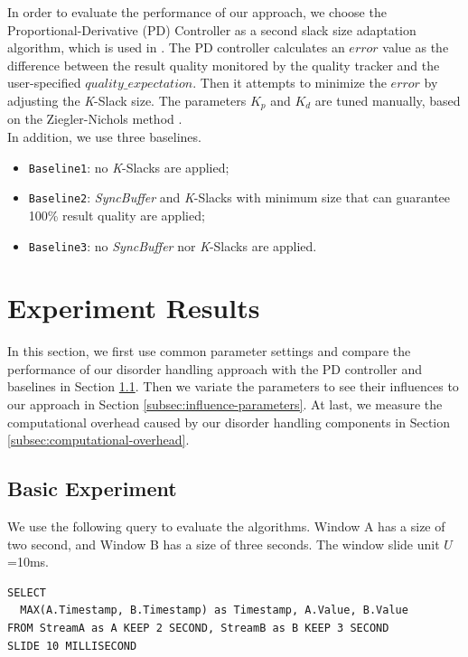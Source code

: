 \documentclass[a4paper, 11pt, twoside]{report}
\begin{document}
In order to evaluate the performance of our approach, we choose the Proportional-Derivative (PD) Controller \cite{astrom1995pid} as a second slack size adaptation algorithm, which is used in \cite{Lisa}. The PD controller calculates an $error$ value as the difference between the result quality monitored by the quality tracker and the user-specified $quality\_expectation$. Then it attempts to minimize the $error$ by adjusting the \textit{K}-Slack size. The parameters $K_p$ and $K_d$ are tuned manually, based on the Ziegler-Nichols method \cite{ziegler1942optimum}.\\

In addition, we use three baselines.

\begin{itemize}
\item \texttt{Baseline1}: no \textit{K}-Slacks are applied;
\item \texttt{Baseline2}: \textit{SyncBuffer} and \textit{K}-Slacks with minimum size that can guarantee 100\% result quality are applied;
\item \texttt{Baseline3}: no \textit{SyncBuffer} nor \textit{K}-Slacks are applied.
\end{itemize}

\section{Experiment Results}
\label{sec:experiment results}

In this section, we first use common parameter settings and compare the performance of our disorder handling approach with the PD controller and baselines in Section \ref{subsec:basic-experiment}. Then we variate the parameters to see their influences to our approach in Section \ref{subsec:influence-parameters}. At last, we measure the computational overhead caused by our disorder handling components in Section \ref{subsec:computational-overhead}.

\subsection{Basic Experiment}
\label{subsec:basic-experiment}

We use the following query to evaluate the algorithms. Window A has a size of two second, and Window B has a size of three seconds. The window slide unit $U$=10ms.

\begin{verbatim}
SELECT 
  MAX(A.Timestamp, B.Timestamp) as Timestamp, A.Value, B.Value
FROM StreamA as A KEEP 2 SECOND, StreamB as B KEEP 3 SECOND
SLIDE 10 MILLISECOND
\end{verbatim}
\end{document}
